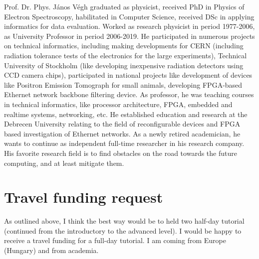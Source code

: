 \documentclass[preprint,12pt,authoryear]{article}
\begin{document}
Prof. Dr. Phys. J\'anos V\'egh graduated as physicist, received PhD in Physics of Electron Spectroscopy, habilitated in Computer Science, received DSc in applying informatics for data evaluation. Worked as research physicist in period 1977-2006, as University Professor in period 2006-2019. He participated in numerous projects on technical informatics, including making developments for CERN (including radiation tolerance tests of the electronics for the large experiments), Technical University of Stockholm (like developing inexpensive radiation detectors using CCD camera chips), participated in national projects like development of devices like Positron Emission Tomograph for small animals, developing FPGA-based Ethernet network backbone filtering device. As professor, he was teaching courses in technical informatics, like processor architecture, FPGA, embedded and realtime systems, networking, etc. He established education and research at the Debrecen University relating to the field of reconfigurable devices and FPGA based investigation of Ethernet networks. As a newly retired academician, he wants to continue as independent full-time researcher in his research company.
His favorite research field is to find obstacles on the road
towards the future computing, and at least mitigate them.

\section{Travel funding request}
As outlined above, I think the best way would be to held
two half-day tutorial (continued from the introductory to the advanced level).
I would be happy to receive a travel funding for a full-day tutorial.
I am coming from Europe (Hungary) and from academia.
\end{document}
